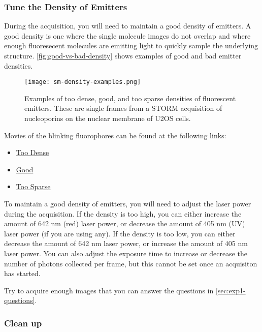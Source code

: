 \documentclass[10pt,a4paper,oneside]{book}
\begin{document}
\subsubsection{Tune the Density of Emitters}

During the acquisition, you will need to maintain a good density of emitters. A good density is one where the single molecule images do not overlap and where enough fluoresecent molecules are emitting light to quickly sample the underlying structure. \autoref{fig:good-vs-bad-density} shows examples of good and bad emitter densities.

\begin{figure}[ht]
    \centering
    \texttt{[image: sm-density-examples.png]}
    \caption{Examples of too dense, good, and too sparse densities of fluorescent emitters. These are single frames from a STORM acquisition of nucleoporins on the nuclear membrane of U2OS cells.}
    \label{fig:good-vs-bad-density}
\end{figure}

Movies of the blinking fluorophores can be found at the following links:

\begin{itemize}
    \item \href{https://drive.google.com/file/d/12zIK-BqMl0qttkYljKi7P9xZ3krMvthe/view?usp=sharing}{Too Dense}
    \item \href{https://drive.google.com/file/d/1Is4U-K297sku4u20OJqwY6IOUags1bLl/view?usp=sharing}{Good}
    \item \href{https://drive.google.com/file/d/1W2AxVjYirPj8t8d2__m8rNoNTUyM3RfY/view?usp=sharing}{Too Sparse}
\end{itemize}

To maintain a good density of emitters, you will need to adjust the laser power during the acquisition. If the density is too high, you can either increase the amount of 642 nm (red) laser power, or decrease the amount of 405 nm (UV) laser power (if you are using any). If the density is too low, you can either decrease the amount of 642 nm laser power, or increase the amount of 405 nm laser power. You can also adjust the exposure time to increase or decrease the number of photons collected per frame, but this cannot be set once an acquisiton has started.

Try to acquire enough images that you can answer the questions in \autoref{sec:exp1-questions}.

\subsubsection{Clean up}
\end{document}
